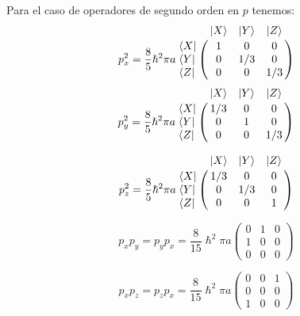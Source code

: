 \documentclass[10pt,a4paper]{article}
\begin{document}
Para el caso de operadores de segundo orden en $p$ tenemos:
\begin{equation}
p_x^2=\frac{8}{5}\hslash^2\pi a \bordermatrix{~   &       |X\rangle & |Y\rangle & |Z\rangle \cr
                                              \langle X| & 1        &  0         & 0        \cr
                                              \langle Y| & 0        &  1/3       & 0        \cr
                                              \langle Z| & 0        &  0         & 1/3      \cr}
\end{equation}
\begin{equation}
p_y^2=\frac{8}{5}\hslash^2\pi a \bordermatrix{~   &       |X\rangle & |Y\rangle & |Z\rangle \cr
                                              \langle X| & 1/3      &  0         & 0        \cr
                                              \langle Y| & 0        &  1         & 0        \cr
                                              \langle Z| & 0        &  0         & 1/3      \cr}
\end{equation}

\begin{equation}
p_z^2=\frac{8}{5}\hslash^2\pi a \bordermatrix{~   &       |X\rangle & |Y\rangle & |Z\rangle \cr
                                              \langle X| & 1/3      &  0         & 0        \cr
                                              \langle Y| & 0        &  1/3       & 0        \cr
                                              \langle Z| & 0        &  0         & 1        \cr}
\end{equation}



\begin{equation}
p_xp_y=p_yp_x=\frac{8}{15}\hslash^2\pi a \begin{pmatrix}
                                         0 & 1 & 0 \\
                                         1 & 0 & 0 \\
                                         0 & 0 & 0
                                         \end{pmatrix}
\end{equation}

\begin{equation}
p_xp_z=p_zp_x=\frac{8}{15}\hslash^2\pi a \begin{pmatrix}
                                         0 & 0 & 1 \\
                                         0 & 0 & 0 \\
                                         1 & 0 & 0
                                         \end{pmatrix}
\end{equation}
\end{document}
